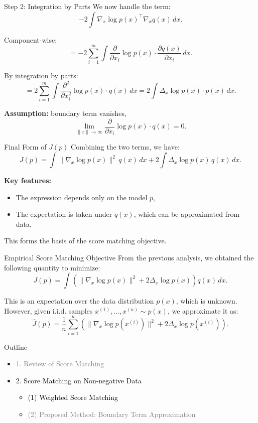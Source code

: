 \documentclass[aspectratio=169]{beamer}
\begin{document}
\begin{frame}{Step 2: Integration by Parts}
We now handle the term:
\[
-2 \int \nabla_x \log p(x)^\top \nabla_x q(x) \, dx.
\]

Component-wise:
\[
= -2 \sum_{i=1}^m \int   \frac{\partial}{\partial x_i} \log p(x) \cdot\frac{\partial q(x)}{\partial x_i}\, dx.
\]

By integration by parts:
\[
= 2 \sum_{i=1}^m \int\frac{\partial^2}{\partial x_i^2} \log p(x) \cdot q(x)\, dx
= 2 \int  \Delta_x \log p(x) \cdot p(x)\, dx.
\]

\textbf{Assumption:} boundary term vanishes,
\[
\lim_{\|x\| \to \infty} \frac{\partial}{\partial x_i} \log p(x) \cdot q(x)= 0.
\]
\end{frame}
\begin{frame}{Final Form of \( J(p) \)}
Combining the two terms, we have:
\[
J(p)
= \int \|\nabla_x \log p(x)\|^2 \, q(x)\, dx
+ 2 \int \Delta_x \log p(x)\, q(x)\, dx.
\]

\textbf{Key features:}
\begin{itemize}
  \item The expression depends only on the model \( p \),
  \item The expectation is taken under \( q(x) \), which can be approximated from data.
\end{itemize}

This forms the basis of the score matching objective.
\end{frame}
\begin{frame}{Empirical Score Matching Objective}
From the previous analysis, we obtained the following quantity to minimize:
\[
J(p) = \int \left( \|\nabla_x \log p(x)\|^2 + 2 \Delta_x \log p(x) \right) q(x)\, dx.
\]

This is an expectation over the data distribution \( p(x) \), which is unknown.\\[1ex]

However, given i.i.d. samples \( x^{(1)}, \dots, x^{(n)} \sim p(x) \), we approximate it as:
\[
\hat{J}(p) = \frac{1}{n} \sum_{i=1}^n \left( \|\nabla_x \log p(x^{(i)})\|^2 + 2 \Delta_x \log p(x^{(i)}) \right).
\]



\end{frame}
\begin{frame}{Outline}

\begin{itemize}
  \item \textcolor{gray}{1. Review of Score Matching}
  \vspace{0.5em}
  \item \textcolor{black}{2. Score Matching on Non-negative Data}
  \begin{itemize}
    \item \textcolor{black}{(1) Weighted Score Matching}
    \item \textcolor{gray}{(2) Proposed Method: Boundary Term Approximation}
  \end{itemize}
\end{itemize}

\end{frame}
\end{document}
